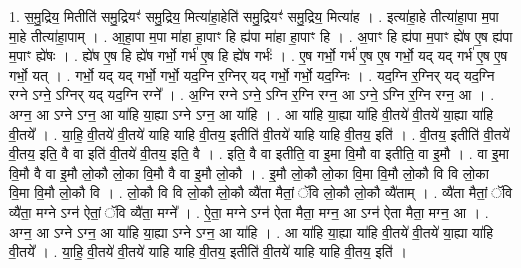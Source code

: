 \documentclass[17pt]{extarticle}
\begin{document}
1. स॒मु॒द्रिय॒ मितीति॑ समु॒द्रियꣳ॑ समु॒द्रिय॒ मित्या॑हा॒हेति॑ समु॒द्रियꣳ॑ समु॒द्रिय॒ मित्या॑ह । . इत्या॑हा॒हे तीत्या॑हा॒पा म॒पा मा॒हे तीत्या॑हा॒पाम् । . आ॒हा॒पा म॒पा मा॑हा हा॒पाꣳ हि ह्य॑पा मा॑हा हा॒पाꣳ हि । . अ॒पाꣳ हि ह्य॑पा म॒पाꣳ ह्ये॑ष ए॒ष ह्य॑पा म॒पाꣳ ह्ये॑षः । . ह्ये॑ष ए॒ष हि ह्ये॑ष गर्भो॒ गर्भ॑ ए॒ष हि ह्ये॑ष गर्भः॑ । . ए॒ष गर्भो॒ गर्भ॑ ए॒ष ए॒ष गर्भो॒ यद् यद् गर्भ॑ ए॒ष ए॒ष गर्भो॒ यत् । . गर्भो॒ यद् यद् गर्भो॒ गर्भो॒ यद॒ग्नि र॒ग्निर् यद् गर्भो॒ गर्भो॒ यद॒ग्निः । . यद॒ग्नि र॒ग्निर् यद् यद॒ग्नि रग्ने ऽग्ने॒ ऽग्निर् यद् यद॒ग्नि रग्ने᳚ । . अ॒ग्नि रग्ने ऽग्ने॒ ऽग्नि र॒ग्नि रग्न॒ आ ऽग्ने॒ ऽग्नि र॒ग्नि रग्न॒ आ । . अग्न॒ आ ऽग्ने ऽग्न॒ आ या॑हि या॒ह्या ऽग्ने ऽग्न॒ आ या॑हि । . आ या॑हि या॒ह्या या॑हि वी॒तये॑ वी॒तये॑ या॒ह्या या॑हि वी॒तये᳚ । . या॒हि॒ वी॒तये॑ वी॒तये॑ याहि याहि वी॒तय॒ इतीति॑ वी॒तये॑ याहि याहि वी॒तय॒ इति॑ । . वी॒तय॒ इतीति॑ वी॒तये॑ वी॒तय॒ इति॒ वै वा इति॑ वी॒तये॑ वी॒तय॒ इति॒ वै । . इति॒ वै वा इतीति॒ वा इ॒मा वि॒मौ वा इतीति॒ वा इ॒मौ । . वा इ॒मा वि॒मौ वै वा इ॒मौ लो॒कौ लो॒का वि॒मौ वै वा इ॒मौ लो॒कौ । . इ॒मौ लो॒कौ लो॒का वि॒मा वि॒मौ लो॒कौ वि वि लो॒का वि॒मा वि॒मौ लो॒कौ वि । . लो॒कौ वि वि लो॒कौ लो॒कौ व्यै॑ता मैतां॒ ॅवि लो॒कौ लो॒कौ व्यै॑ताम् । . व्यै॑ता मैतां॒ ॅवि व्यै॑ता॒ मग्ने ऽग्न॑ ऐतां॒ ॅवि व्यै॑ता॒ मग्ने᳚ । . ऐ॒ता॒ मग्ने ऽग्न॑ ऐता मैता॒ मग्न॒ आ ऽग्न॑ ऐता मैता॒ मग्न॒ आ । . अग्न॒ आ ऽग्ने ऽग्न॒ आ या॑हि या॒ह्या ऽग्ने ऽग्न॒ आ या॑हि । . आ या॑हि या॒ह्या या॑हि वी॒तये॑ वी॒तये॑ या॒ह्या या॑हि वी॒तये᳚ । . या॒हि॒ वी॒तये॑ वी॒तये॑ याहि याहि वी॒तय॒ इतीति॑ वी॒तये॑ याहि याहि वी॒तय॒ इति॑ । \newline
\end{document}
